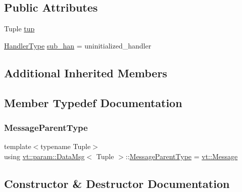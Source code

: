 \subsection*{Public Attributes}
\begin{DoxyCompactItemize}
\item 
Tuple \hyperlink{structvt_1_1param_1_1_data_msg_aa607f9d80d37b1c72f284ea3048e5788}{tup}
\item 
\hyperlink{namespacevt_af64846b57dfcaf104da3ef6967917573}{Handler\+Type} \hyperlink{structvt_1_1param_1_1_data_msg_a5356937e3d47eff93d8b0c59247c5809}{sub\+\_\+han} = uninitialized\+\_\+handler
\end{DoxyCompactItemize}
\subsection*{Additional Inherited Members}


\subsection{Member Typedef Documentation}
\mbox{\label{structvt_1_1param_1_1_data_msg_a6a0987fc4a53eb4fb13d9ef73106d7a2}} 
\subsubsection{\texorpdfstring{Message\+Parent\+Type}{MessageParentType}}
{\footnotesize\ttfamily template$<$typename Tuple$>$ \\
using \hyperlink{structvt_1_1param_1_1_data_msg}{vt\+::param\+::\+Data\+Msg}$<$ Tuple $>$\+::\hyperlink{structvt_1_1messaging_1_1_active_msg_ac2e6d93267991027ce78c968b17064c7}{Message\+Parent\+Type} =  \hyperlink{namespacevt_a3a3ddfef40b4c90915fa43cdd5f129ea}{vt\+::\+Message}}



\subsection{Constructor \& Destructor Documentation}
\mbox{\label{structvt_1_1param_1_1_data_msg_a6035a979b9ee9448fba9dd78cd976ed5}} 
